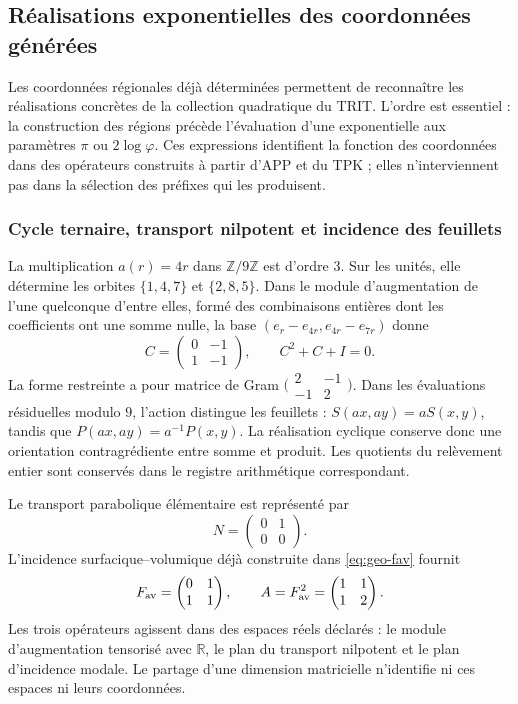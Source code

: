 \subsection{Réalisations exponentielles des coordonnées générées}
\label{geo-euler-trit-articulacion}

Les coordonnées régionales déjà déterminées permettent de reconnaître les
réalisations concrètes de la collection quadratique du TRIT. L'ordre est
essentiel : la construction des régions précède l'évaluation d'une
exponentielle aux paramètres \(\pi\) ou \(2\log\varphi\). Ces expressions
identifient la fonction des coordonnées dans des opérateurs construits à partir
d'APP et du TPK ; elles n'interviennent pas dans la sélection des préfixes qui les produisent.

\subsubsection{Cycle ternaire, transport nilpotent et incidence des feuillets}

La multiplication \(a(r)=4r\) dans \(\mathbb Z/9\mathbb Z\) est d’ordre
\(3\). Sur les unités, elle détermine les orbites \(\{1,4,7\}\) et
\(\{2,8,5\}\). Dans le module d’augmentation de l’une quelconque d’entre elles, formé
des combinaisons entières dont les coefficients ont une somme nulle, la base
\((e_r-e_{4r},e_{4r}-e_{7r})\) donne
\[
 C=\begin{pmatrix}0&-1\\1&-1\end{pmatrix},
 \qquad C^2+C+I=0.
\]
La forme restreinte a pour matrice de Gram
\(\bigl(\begin{smallmatrix}2&-1\\-1&2\end{smallmatrix}\bigr)\).
Dans les évaluations résiduelles modulo \(9\), l’action distingue les feuillets :
\(S(ax,ay)=aS(x,y)\), tandis que \(P(ax,ay)=a^{-1}P(x,y)\).
La réalisation cyclique conserve donc une orientation contragrédiente
entre somme et produit. Les quotients du relèvement entier sont conservés
dans le registre arithmétique correspondant.

Le transport parabolique élémentaire est représenté par
\[
 N=\begin{pmatrix}0&1\\0&0\end{pmatrix}.
\]
L’incidence surfacique--volumique déjà construite dans \eqref{eq:geo-fav} fournit
\[
 F_{\rm av}=\begin{pmatrix}0&1\\1&1\end{pmatrix},
 \qquad A=F_{\rm av}^2=\begin{pmatrix}1&1\\1&2\end{pmatrix}.
\]
Les trois opérateurs agissent dans des espaces réels déclarés : le module
d’augmentation tensorisé avec \(\mathbb R\), le plan du transport nilpotent et
le plan d’incidence modale. Le partage d’une dimension matricielle n’identifie
ni ces espaces ni leurs coordonnées.

